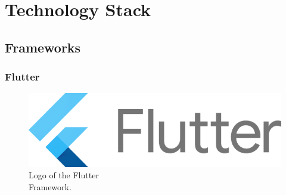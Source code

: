 \section{Technology Stack}

\subsection{Frameworks}

\subsubsection{Flutter}

\begin{figure} %
    \captionsetup{font=footnotesize}
    \centering
    \includegraphics[width=\linewidth]{images/flutter.png}
    \caption{Logo of the Flutter\\Framework.}
\end{figure}

